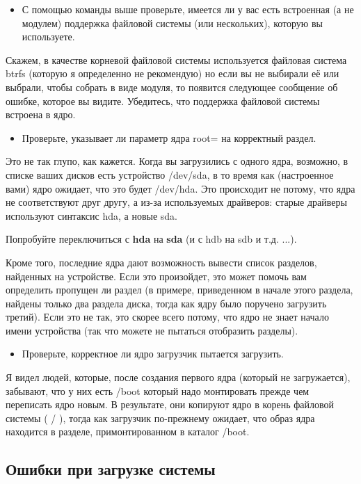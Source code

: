 \documentclass[10pt]{book}
\begin{document}
\begin{itemize}
\item С помощью команды выше проверьте, имеется ли у вас есть встроенная (а не модулем) поддержка файловой системы (или нескольких), которую вы используете.
\end{itemize}

Скажем, в качестве корневой файловой системы используется файловая система btrfs (которую я определенно не рекомендую) но если вы не выбирали её или выбрали, чтобы собрать в виде модуля, то появится следующее сообщение об ошибке, которое вы видите. Убедитесь, что поддержка файловой системы встроена в ядро.

\begin{itemize}
\item Проверьте, указывает ли параметр ядра root= на корректный раздел.
\end{itemize}

Это не так глупо, как кажется. Когда вы загрузились с одного ядра, возможно, в списке ваших дисков есть устройство /dev/sda, в то время как (настроенное вами) ядро ожидает, что это будет /dev/hda. Это происходит не потому, что ядра не соответствуют друг другу, а из-за используемых драйверов: старые драйверы используют синтаксис hda, а новые sda.

Попробуйте переключиться с \textbf{hda} на \textbf{sda} (и с hdb на sdb и т.д. ...).

Кроме того, последние ядра дают возможность вывести список разделов, найденных на устройстве. Если это произойдет, это может помочь вам определить пропущен ли раздел (в примере, приведенном в начале этого раздела, найдены только два раздела диска,  тогда как ядру было поручено загрузить третий). Если это не так, это скорее всего потому, что ядро не знает начало имени устройства (так что можете не пытаться отобразить разделы).

\begin{itemize}
\item Проверьте, корректное ли ядро загрузчик пытается загрузить.
\end{itemize}

Я видел людей, которые, после создания первого ядра (который не загружается), забывают, что у них есть /boot который надо монтировать прежде чем переписать ядро новым. 
В результате, они копируют ядро в корень файловой системы ( / ), тогда как загрузчик по-прежнему ожидает, что образ ядра находится в разделе, примонтированном в каталог /boot.

\subsection{Ошибки при загрузке системы}
\end{document}
